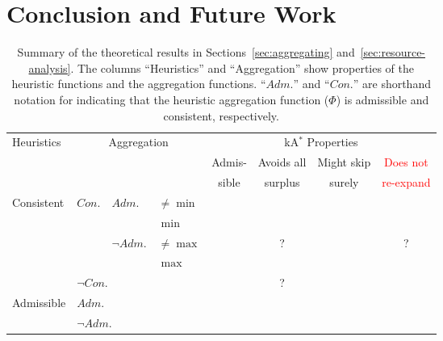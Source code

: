 \documentclass[smallextended]{svjour3}       %
\newcommand{\cmark}{\textcolor{green}{\ding{51}}}
\newcommand{\xmark}{\textcolor{red}{\ding{55}}}
\newcommand{\kastar}{kA$^*$\xspace}
\newcommand{\axiomadm}{admissible\xspace}
\newcommand{\axiomcons}{consistent\xspace}
\newcommand{\axiomreexp}{re-expansion-avoiding\xspace}
\newcommand{\shortadm}{\mathit{Adm.}}
\newcommand{\shortcon}{\mathit{Con.}}
\newcommand{\shortree}{\mathit{Ree.}}
\begin{document}

\section{Conclusion and Future Work}
\label{sec:conclusion}


\begin{table}
\centering
\begin{tabular}{ll@{\;}l@{\;}l*4{c}}
\toprule
Heuristics & \multicolumn{3}{c}{Aggregation} & \multicolumn{4}{c}{\kastar Properties}\\
\cmidrule{5-8}
&&&& \multirow{1}{*}{Admis-} & Avoids all & Might skip & \textcolor{red}{Does not} \\
&&&& sible & surplus & surely & \textcolor{red}{re-expand}\\
\midrule
\multirow{5}{*}{Consistent}
& \multirow{4}{*}{$\shortcon$} & \multirow{2}{*}{$\shortadm$} & $\neq \min$ & \cmark & \xmark & \xmark & \xmark \\
& & & $\min$ &  \cmark & \cmark & \xmark & \cmark\\
\cmidrule{3-4}
& & \multirow{2}{*}{$\neg \shortadm$} & $\neq \max$ & \cmark & ? & \cmark & ? \\
& & & $\max$ &  \cmark & \xmark & \cmark & \cmark\\
\cmidrule{2-4}
& \multicolumn{3}{l}{$\neg \shortcon$} & \xmark & ? & \cmark & \xmark\\
\midrule
\multirow{2}{*}{Admissible}
& \multicolumn{3}{l}{$\shortadm$} & \cmark & \xmark & \xmark & \xmark\\
& \multicolumn{3}{l}{$\neg \shortadm$} & \xmark & \xmark & \cmark & \xmark\\
\bottomrule
\end{tabular}
\caption{Summary of the theoretical results in Sections~\ref{sec:aggregating} and~\ref{sec:resource-analysis}. 
The columns ``Heuristics'' and ``Aggregation'' show properties of the heuristic functions and the aggregation functions. 
``$\shortadm$'' and ``$\shortcon$'' are shorthand notation for indicating that the heuristic aggregation function ($\Phi$) is \axiomadm and \axiomcons, respectively.
}
\end{table}
\end{document}
